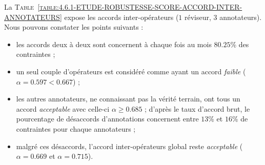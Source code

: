 			La \textsc{Table~\ref{table:4.6.1-ETUDE-ROBUSTESSE-SCORE-ACCORD-INTER-ANNOTATEURS}} expose les accords inter-opérateurs ($1$ réviseur, $3$ annotateurs).
			Nous pouvons constater les points suivants :
			\begin{itemize}
				\item les accords deux à deux sont concernent à chaque fois au mois $80.25$\% des contraintes ;
				\item un seul couple d'opérateurs est considéré comme ayant un accord \textit{faible} ($\alpha = 0.597 < 0.667$) ;
				\item les autres annotateurs, ne connaissant pas la vérité terrain, ont tous un accord \textit{acceptable} avec celle-ci $\alpha \geq 0.685$ ; d'après le taux d'accord brut, le pourcentage de désaccords d'annotations concernent entre $13$\% et $16$\% de contraintes pour chaque annotateurs ;
				\item malgré ces désaccords, l'accord inter-opérateurs global reste \textit{acceptable} ($\alpha = 0.669$ et $\alpha = 0.715$).
			\end{itemize}
			
